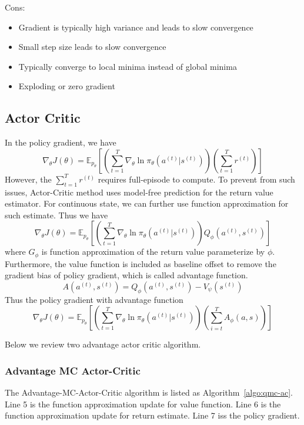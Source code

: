 \documentclass[11pt]{article}
\begin{document}
Cons:
\begin{itemize}
    \item Gradient is typically high variance and leads to slow convergence
    \item Small step size leads to slow convergence
    \item Typically converge to local minima instead of global minima
    \item Exploding or zero gradient
\end{itemize}

\subsection{Actor Critic}
In the policy gradient, we have
$$\nabla_\theta J(\theta) = \mathbb{E}_{p_\theta} [(\sum_{t=1}^T \nabla_\theta \ln \pi_\theta (a^{(t)} | s^{(t)}))(\sum_{t=1}^T r^{(t)})]$$
However, the $\sum_{t=1}^T r^{(t)}$ requires full-episode to compute. To prevent from such issues, Actor-Critic method uses model-free prediction for the return value estimator. For continuous state, we can further use function approximation for such estimate. Thus we have
$$\nabla_\theta J(\theta) = \mathbb{E}_{p_\theta} [(\sum_{t=1}^T \nabla_\theta \ln \pi_\theta (a^{(t)} | s^{(t)}))Q_\phi (a^{(t)}, s^{(t)})]$$
where $G_\phi$ is function approximation of the return value parameterize by $\phi$. Furthermore, the value function is included as baseline offset to remove the gradient bias of policy gradient, which is called advantage function.
$$A(a^{(t)}, s^{(t)}) = Q_\phi (a^{(t)}, s^{(t)}) - V_\psi (s^{(t)})$$
Thus the policy gradient with advantage function
$$\nabla_\theta J(\theta) = \mathbb{E}_{p_\theta} [(\sum_{t=1}^T \nabla_\theta \ln \pi_\theta (a^{(t)} | s^{(t)}))(\sum_{i=t}^T A_\phi (a, s))]$$

Below we review two advantage actor critic algorithm. 

\subsubsection{Advantage MC  Actor-Critic}
The Advantage-MC-Actor-Critic algorithm is listed as Algorithm~\ref{algo:qmc-ac}. Line 5 is the function approximation update for value function. Line 6 is the function approximation update for return estimate. Line 7 iss the policy gradient.
\end{document}
